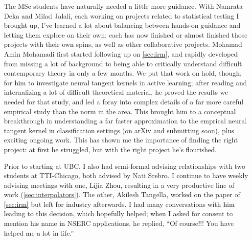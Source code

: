 \documentclass[12pt]{article}
\begin{document}
{{{{The MSc students have naturally needed a little more guidance.
With Namrata Deka and Milad Jalali, each working on projects related to statistical testing I brought up,
I've learned a lot about balancing between hands-on guidance and letting them explore on their own;
each has now finished or almost finished those projects with their own spins,
as well as other collaborative projects.
Mohamad Amin Mohamadi first started following up on \cref{sec:irm},
and rapidly developed from missing a lot of background to being able to critically understand difficult contemporary theory in only a few months.
We put that work on hold, though, for him to investigate neural tangent kernels in active learning;
after reading and internalizing a lot of difficult theoretical material,
he proved the results we needed for that study,
and led a foray into complex details of a far more careful empirical study than the norm in the area.
This brought him to a conceptual breakthrough in understanding a far faster approximation to the emprical neural tangent kernel in classification settings (on arXiv and submitting soon), plus exciting ongoing work.
This has shown me the importance of finding the right project:
at first he struggled, but with the right project he's flourished.

Prior to starting at UBC,
I also had semi-formal advising relationships with two students at TTI-Chicago,
both advised by Nati Srebro. %
I continue to have weekly advising meetings with one, Lijia Zhou, resulting in a very productive line of work (\cref{sec:interpolators}).
The other,
Akilesh Tangella,
worked on the paper of \cref{sec:irm}
but left for industry afterwards.
I had many conversations with him leading to this decision, which hopefully helped;
when I asked for consent to mention his name in NSERC applications, he replied, ``Of course!!! You have helped me a lot in life.''

}}}}
\end{document}
